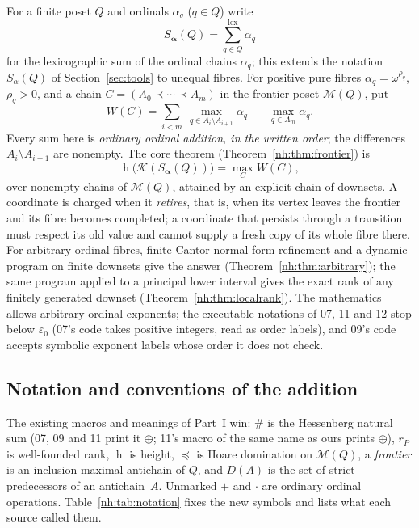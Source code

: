 \documentclass[11pt,a4paper]{article}
\theoremstyle{definition}
\theoremstyle{remark}
\newcommand{\K}{\mathcal K}
\newcommand{\M}{\mathcal M}
\newcommand{\hgt}{\operatorname{h}}
\newcommand{\ns}{\mathbin{\#}}
\newcommand{\eps}{\varepsilon_0}
\newcommand{\lxs}{\mathop{\sum}\limits^{\mathrm{lex}}}
\begin{document}
For a finite poset $Q$ and ordinals $\alpha_q$ ($q\in Q$) write
\[
 S_{\boldsymbol\alpha}(Q)=\lxs_{q\in Q}\alpha_q
\]
for the lexicographic sum of the ordinal chains $\alpha_q$; this extends the
notation $S_\alpha(Q)$ of Section~\ref{sec:tools} to unequal fibres. For
positive pure fibres $\alpha_q=\omega^{\rho_q}$, $\rho_q>0$, and a chain
$C=(A_0\prec\cdots\prec A_m)$ in the frontier poset $\M(Q)$, put
\begin{equation}\label{nh:eq:cost}
 W(C)=\sum_{i<m}\ \max_{q\in A_i\setminus A_{i+1}}\alpha_q
      \;+\;\max_{q\in A_m}\alpha_q .
\end{equation}
Every sum here is \emph{ordinary ordinal addition, in the written order}; the
differences $A_i\setminus A_{i+1}$ are nonempty. The core theorem
(Theorem~\ref{nh:thm:frontier}) is
\begin{equation}\label{nh:eq:answer}
 \boxed{\displaystyle
 \hgt\bigl(\K(S_{\boldsymbol\alpha}(Q))\bigr)=\max_{C}W(C),}
\end{equation}
over nonempty chains of $\M(Q)$, attained by an explicit chain of downsets.
A coordinate is charged when it \emph{retires}, that is, when its vertex
leaves the frontier and its fibre becomes completed; a coordinate that
persists through a transition must respect its old value and cannot supply a
fresh copy of its whole fibre there. For arbitrary ordinal fibres, finite
Cantor-normal-form refinement and a dynamic program on finite downsets give
the answer (Theorem~\ref{nh:thm:arbitrary}); the same program applied to a
principal lower interval gives the exact rank of any finitely generated
downset (Theorem~\ref{nh:thm:localrank}). The mathematics allows arbitrary
ordinal exponents; the executable notations of 07, 11 and 12 stop below
$\eps$ (07's code takes positive integers, read as order labels), and 09's
code accepts symbolic exponent labels whose order it does not check.

\subsection{Notation and conventions of the addition}\label{nh:sec:notation}

The existing macros and meanings of Part~I win: $\ns$ is the Hessenberg
natural sum (07, 09 and 11 print it $\oplus$; 11's macro of the same name as
ours prints $\oplus$), $r_P$ is well-founded rank, $\hgt$ is height,
$\preceq$ is Hoare domination on $\M(Q)$, a \emph{frontier} is an
inclusion-maximal antichain of $Q$, and $D(A)$ is the set of strict
predecessors of an antichain~$A$. Unmarked $+$ and $\cdot$ are ordinary
ordinal operations. Table~\ref{nh:tab:notation} fixes the new symbols and
lists what each source called them.
\end{document}
